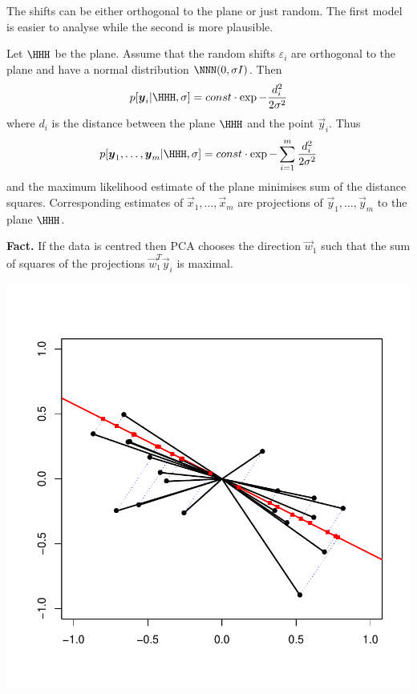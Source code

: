 \documentclass[landscape,footrule]{foils}
\newcommand{\lastline}{\vspace*{-2ex}}
\begin{document}
The shifts can be either orthogonal to the plane or just random. The first model is easier to analyse while the second is more plausible. 



Let $\HHH$ be the plane. Assume that the random shifts $\varepsilon_i$ are orthogonal to the plane and have a normal distribution $\NNN(0,\sigma I)$. Then 
\begin{align*}
p[\vec{y}_i|\HHH,\sigma]=const\cdot\exp{-\frac{d_i^2}{2\sigma^2}}
\end{align*}
where $d_i$ is the distance between the plane $\HHH$ and the point $\vec{y}_i$. Thus
\begin{align*}
p[\vec{y}_1,\ldots,\vec{y}_m|\HHH,\sigma]=const\cdot\exp{-\sum_{i=1}^m\frac{d_i^2}{2\sigma^2}}
\end{align*}
and the maximum likelihood estimate of the plane minimises sum of the distance squares. Corresponding estimates of $\vec{x}_1,\ldots,\vec{x}_m$ are projections of $\vec{y}_1,\ldots,\vec{y}_m$ to the plane $\HHH$.\lastline 


\textbf{Fact.} If the data is centred then PCA chooses the direction $\vec{w}_1$ such that
the sum of squares of the projections $\vec{w}_1^T \vec{y}_i$ is maximal.\vspace*{-1cm}

\begin{center}
\includegraphics[scale=0.65]{orthogonal-projection.pdf}
\end{center}\vspace*{-1cm}
\end{document}
